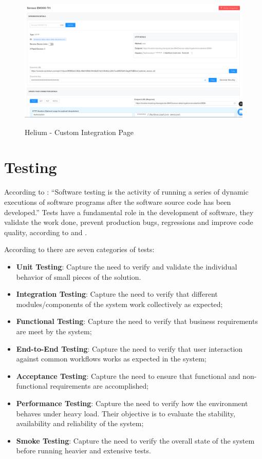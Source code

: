 \begin{figure}
    \centering
    \resizebox{\columnwidth}{!}
    {
       \includegraphics{assets/figures/sensor/integration.png}
    }
    \caption[Helium - Custom Integration Page]{Helium - Custom Integration Page}
    \label{fig:implementation:description:sensor:integration}
\end{figure}

\section{Testing}
\label{sec:implementation:testing}

According to \cite{booktest}: ``Software testing is the activity of running a series of dynamic executions of software programs after the software source code has been developed.''
Tests have a fundamental role in the development of software, they validate the work done, prevent production bugs, regressions and improve code quality, according to \cite{linuxtest} and \cite{imbtest}.

According to \cite{typetest} there are seven categories of tests:

\begin{itemize}
    \item \textbf{Unit Testing}: Capture the need to verify and validate the individual behavior of small pieces of the solution.
    \item \textbf{Integration Testing}: Capture the need to verify that different modules/components of the system work collectively as expected;
    \item \textbf{Functional Testing}: Capture the need to verify that business requirements are meet by the system;
    \item \textbf{End-to-End Testing}: Capture the need to verify that user interaction against common workflows works as expected in the system;
    \item \textbf{Acceptance Testing}: Capture the need to ensure that functional and non-functional requirements are accomplished;
    \item \textbf{Performance Testing}: Capture the need to verify how the environment behaves under heavy load. Their objective is to evaluate the stability, availability and reliability of the system;
    \item \textbf{Smoke Testing}: Capture the need to verify the overall state of the system before running heavier and extensive tests.
\end{itemize}

